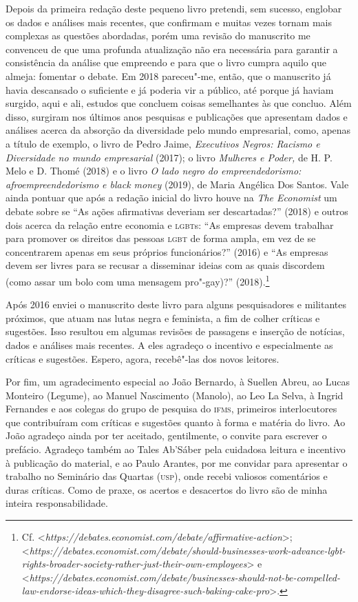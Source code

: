 Depois da primeira redação deste pequeno livro pretendi, sem sucesso,
englobar os dados e análises mais recentes, que confirmam e muitas vezes
tornam mais complexas as questões abordadas, porém uma revisão do
manuscrito me convenceu de que uma profunda atualização não era
necessária para garantir a consistência da análise que empreendo e para
que o livro cumpra aquilo que almeja: fomentar o debate. Em 2018
pareceu"-me, então, que o manuscrito já havia descansado o suficiente e
já poderia vir a público, até porque já haviam surgido, aqui e ali,
estudos que concluem coisas semelhantes às que concluo. Além disso,
surgiram nos últimos anos pesquisas e publicações que apresentam dados e
análises acerca da absorção da diversidade pelo mundo empresarial, como,
apenas a título de exemplo, o livro de Pedro Jaime, \emph{Executivos
Negros: Racismo e Diversidade no mundo empresarial} (2017); o livro
\emph{Mulheres e Poder,} de H. P. Melo e D. Thomé (2018) e o livro
\emph{O lado negro do empreendedorismo: afroempreendedorismo e black
money} (2019), de Maria Angélica Dos Santos. Vale ainda pontuar que após
a redação inicial do livro houve na \emph{The Economist} um debate sobre
se ``As ações afirmativas deveriam ser descartadas?'' (2018) e outros
dois acerca da relação entre economia e \textsc{lgbt}s: ``As empresas devem
trabalhar para promover os direitos das pessoas \textsc{lgbt} de forma ampla, em
vez de se concentrarem apenas em seus próprios funcionários?'' (2016) e
``As empresas devem ser livres para se recusar a disseminar ideias com
as quais discordem (como assar um bolo com uma mensagem pro"-gay)?''
(2018).\footnote{Cf.
  \textless{}\emph{https://debates.economist.com/debate/affirmative-action}\textgreater{};
  \textless{}\emph{https://debates.economist.com/debate/should-businesses-work-advance-lgbt-rights-broader-society-rather-just-their-own-employees}\textgreater{}
  e
  \textless{}\emph{https://debates.economist.com/debate/businesses-should-not-be-compelled-law-endorse-ideas-which-they-disagree-such-baking-cake-pro}\textgreater{}.}

Após 2016 enviei o manuscrito deste livro para alguns pesquisadores e
militantes próximos, que atuam nas lutas negra e feminista, a fim de
colher críticas e sugestões. Isso resultou em algumas revisões de
passagens e inserção de notícias, dados e análises mais recentes. A eles
agradeço o incentivo e especialmente as críticas e sugestões. Espero,
agora, recebê"-las dos novos leitores.

Por fim, um agradecimento especial ao João Bernardo, à Suellen Abreu, ao
Lucas Monteiro (Legume), ao Manuel Nascimento (Manolo), ao Leo La Selva,
à Ingrid Fernandes e aos colegas do grupo de pesquisa do \textsc{ifms}, primeiros
interlocutores que contribuíram com críticas e sugestões quanto à forma
e matéria do livro. Ao João agradeço ainda por ter aceitado,
gentilmente, o convite para escrever o prefácio. Agradeço também ao
Tales Ab'Sáber pela cuidadosa leitura e incentivo à publicação do
material, e ao Paulo Arantes, por me convidar para apresentar o trabalho
no Seminário das Quartas (\textsc{usp}), onde recebi valiosos comentários e duras
críticas. Como de praxe, os acertos e desacertos do livro são de minha
inteira responsabilidade.

